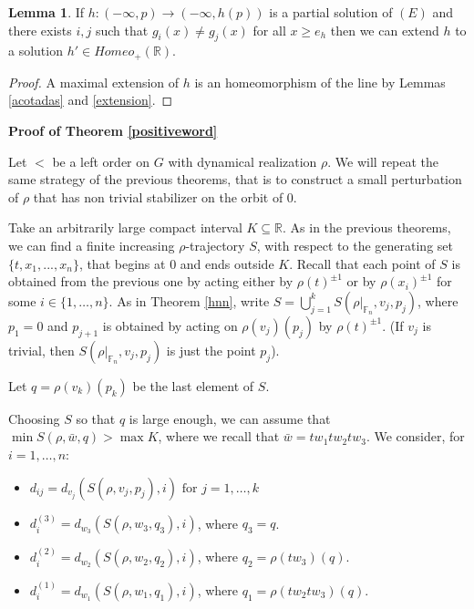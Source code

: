 \documentclass[12pt]{article}
\newcommand{\F}{\mathbb{F}}
\newcommand{\R}{\mathbb{R}}
\theoremstyle{definition}
\newtheorem{lem}[thm]{Lemma}
\newcommand{\vs}{\vspace{0.3cm}}
\begin{document}
\begin{lem} \label{globalema} If $h:(-\infty,p)\to(-\infty,h(p))$ is a partial solution of $(E)$ and there exists $i,j$ such that $g_i(x)\neq g_j(x)$ for all $x\geq e_h$ then we can extend $h$ to a solution $h'\in Homeo_{+}(\R)$.
\end{lem}
\begin{proof} A maximal extension of $h$ is an homeomorphism of the line by Lemmas \ref{acotadas} and \ref{extension}.
\end{proof}

\newpage 

{\bf Proof of Theorem \ref{positiveword}} 
\vs

Let $<$ be a left order on $G$ with dynamical realization $\rho$. We will repeat the same strategy of the previous theorems, that is to construct a small perturbation of $\rho$ that has non trivial stabilizer on the orbit of $0$.

Take an arbitrarily large compact interval $K\subseteq \R$. As in the previous theorems, we can find a finite increasing $\rho$-trajectory $S$, with respect to the generating set $\{t,x_1,...,x_n\}$, that begins at $0$ and ends outside $K$. Recall that each point of $S$ is obtained from the previous one by acting either by $\rho(t)^{\pm 1}$ or by $\rho(x_i)^{\pm 1}$ for some $i\in\{1,\ldots,n\}$. As in Theorem \ref{hnn}, write $S=\bigcup_{j=1}^k S(\rho|_{\F_n},v_j,p_j)$, where $p_1=0$ and $p_{j+1}$ is obtained by acting on $\rho(v_j)(p_j)$ by $\rho(t)^{\pm 1}$. (If $v_j$ is trivial, then $S(\rho|_{\F_n},v_j,p_j)$ is just the point $p_j$).

Let $q=\rho(v_k)(p_k)$ be the last element of $S$.

Choosing $S$ so that $q$ is large enough, we can assume that $\min S(\rho,\bar w,q)>\max K$, where we recall that $\bar w=tw_1tw_2tw_3$. We consider, for $i=1,\ldots,n$:
\begin{itemize}
\item $d_{ij} = d_{v_j}(S(\rho,v_j,p_j),i) \text{ for } j=1,\ldots,k$
\item $d_i^{(3)}=d_{w_3}( S(\rho,w_3,q_3),i)$, where  $q_3=q$.
\item $d_i^{(2)}=d_{w_2}( S(\rho,w_2,q_2),i)$, where  $q_2=\rho(tw_3)(q)$.
\item $d_i^{(1)}=d_{w_1}( S(\rho,w_1,q_1),i)$, where $q_1=\rho(tw_2tw_3)(q)$.

\end{itemize}
\end{document}
